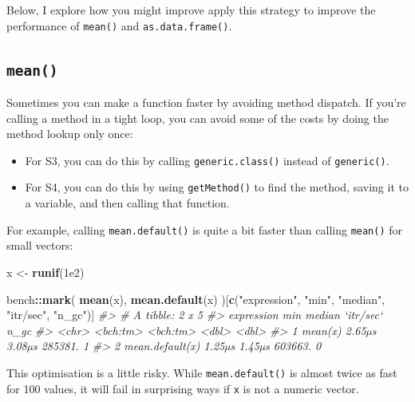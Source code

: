 \documentclass[]{book}
\makeatletter
\newenvironment{Shaded}{\begin{snugshade}}{\end{snugshade}}
\newcommand{\CommentTok}[1]{\textcolor[rgb]{0.37,0.37,0.37}{\textit{#1}}}
\newcommand{\FloatTok}[1]{\textcolor[rgb]{0.06,0.06,0.06}{#1}}
\newcommand{\KeywordTok}[1]{\textcolor[rgb]{0.27,0.27,0.27}{\textbf{#1}}}
\newcommand{\NormalTok}[1]{#1}
\newcommand{\OperatorTok}[1]{\textcolor[rgb]{0.43,0.43,0.43}{\textbf{#1}}}
\newcommand{\StringTok}[1]{\textcolor[rgb]{0.5,0.5,0.5}{#1}}
\newcommand{\indexc}[1]{\index{#1@\texttt{#1}}}
\makeatother
\begin{document}
Below, I explore how you might improve apply this strategy to improve the performance of \texttt{mean()} and \texttt{as.data.frame()}.

\hypertarget{mean}{%
\subsection{\texorpdfstring{\texttt{mean()}}{mean()}}\label{mean}}

\indexc{.Internal()}


Sometimes you can make a function faster by avoiding method dispatch. If you're calling a method in a tight loop, you can avoid some of the costs by doing the method lookup only once:

\begin{itemize}
\item
  For S3, you can do this by calling \texttt{generic.class()} instead of \texttt{generic()}.
\item
  For S4, you can do this by using \texttt{getMethod()} to find the method, saving
  it to a variable, and then calling that function.
\end{itemize}

For example, calling \texttt{mean.default()} is quite a bit faster than calling \texttt{mean()} for small vectors:

\begin{Shaded}
\begin{Highlighting}[]
\NormalTok{x <-}\StringTok{ }\KeywordTok{runif}\NormalTok{(}\FloatTok{1e2}\NormalTok{)}

\NormalTok{bench}\OperatorTok{::}\KeywordTok{mark}\NormalTok{(}
  \KeywordTok{mean}\NormalTok{(x),}
  \KeywordTok{mean.default}\NormalTok{(x)}
\NormalTok{)[}\KeywordTok{c}\NormalTok{(}\StringTok{"expression"}\NormalTok{, }\StringTok{"min"}\NormalTok{, }\StringTok{"median"}\NormalTok{, }\StringTok{"itr/sec"}\NormalTok{, }\StringTok{"n_gc"}\NormalTok{)]}
\CommentTok{#> # A tibble: 2 x 5}
\CommentTok{#>   expression           min   median `itr/sec`  n_gc}
\CommentTok{#>   <chr>           <bch:tm> <bch:tm>     <dbl> <dbl>}
\CommentTok{#> 1 mean(x)           2.65µs   3.08µs   285381.     1}
\CommentTok{#> 2 mean.default(x)   1.25µs   1.45µs   603663.     0}
\end{Highlighting}
\end{Shaded}

This optimisation is a little risky. While \texttt{mean.default()} is almost twice as fast for 100 values, it will fail in surprising ways if \texttt{x} is not a numeric vector.
\end{document}

